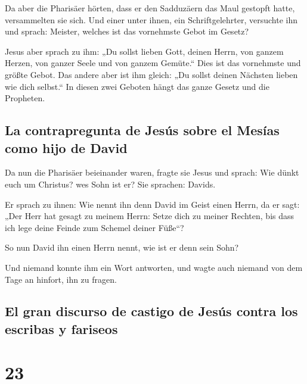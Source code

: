  Da aber die Pharisäer hörten, dass er den Sadduzäern das
Maul gestopft hatte, versammelten sie sich.  Und einer
unter ihnen, ein Schriftgelehrter, versuchte ihn und sprach:
 Meister, welches ist das vornehmste Gebot im Gesetz?

 Jesus aber sprach zu ihm: „Du sollst lieben Gott, deinen
Herrn, von ganzem Herzen, von ganzer Seele und von ganzem Gemüte.``
 Dies ist das vornehmste und größte Gebot.
 Das andere aber ist ihm gleich: „Du sollst deinen
Nächsten lieben wie dich selbst.``  In diesen zwei
Geboten hängt das ganze Gesetz und die Propheten.

\hypertarget{la-contrapregunta-de-jesuxfas-sobre-el-mesuxedas-como-hijo-de-david}{%
\subsection{La contrapregunta de Jesús sobre el Mesías como hijo de
David}\label{la-contrapregunta-de-jesuxfas-sobre-el-mesuxedas-como-hijo-de-david}}

 Da nun die Pharisäer beieinander waren, fragte sie Jesus
 und sprach: Wie dünkt euch um Christus? wes Sohn ist er?
Sie sprachen: Davids.

 Er sprach zu ihnen: Wie nennt ihn denn David im Geist
einen Herrn, da er sagt:  „Der Herr hat gesagt zu meinem
Herrn: Setze dich zu meiner Rechten, bis dass ich lege deine Feinde zum
Schemel deiner Füße``?

 So nun David ihn einen Herrn nennt, wie ist er denn sein
Sohn?

 Und niemand konnte ihm ein Wort antworten, und wagte
auch niemand von dem Tage an hinfort, ihn zu fragen.

\hypertarget{el-gran-discurso-de-castigo-de-jesuxfas-contra-los-escribas-y-fariseos}{%
\subsection{El gran discurso de castigo de Jesús contra los escribas y
fariseos}\label{el-gran-discurso-de-castigo-de-jesuxfas-contra-los-escribas-y-fariseos}}

\hypertarget{section-22}{%
\section{23}\label{section-22}}


